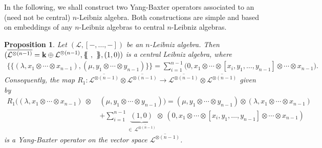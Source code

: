 \documentclass[a4paper,reqno,10pt]{amsart}
\theoremstyle{plain}
\newtheorem{prop}[thm]{Proposition}
\theoremstyle{definition}
\theoremstyle{remark}
\begin{document}
In the following, we shall construct two Yang-Baxter operators associated to an (need not be central) $n$-Leibniz algebra. Both constructions are simple and based on embeddings of any $n$-Leibniz algebras to central $n$-Leibniz algebras.

\begin{prop}
    Let $(\mathcal{L}, [-, \ldots, -])$ be an $n$-Leibniz algebra. Then $( \overline{\mathcal{L}^{\otimes (n-1)}}= {\bf k} \oplus \mathcal{L}^{\otimes (n-1)}, \{ \! \! \{ ~, ~ \} \! \! \}, (1, 0) )$ is a central Leibniz algebra, where
    \begin{align*}
       \{ \! \! \{  (\lambda, x_1 \otimes \cdots \otimes x_{n-1}), (\mu, y_1 \otimes \cdots \otimes y_{n-1}) \} \! \! \} = \sum_{i=1}^{n-1} \big( 0,  x_1 \otimes \cdots \otimes [x_i, y_1, \ldots, y_{n-1}] \otimes \cdots \otimes x_{n-1} \big).
    \end{align*}
    Consequently, the map $R_1 :  \overline{\mathcal{L}^{\otimes (n-1)}} \otimes  \overline{\mathcal{L}^{\otimes (n-1)}} \rightarrow  \overline{\mathcal{L}^{\otimes (n-1)}} \otimes  \overline{\mathcal{L}^{\otimes (n-1)}}$ given by
    \begin{align*}
        R_1 \big(  (\lambda, x_1 \otimes \cdots \otimes x_{n-1}) ~\otimes ~ &  (\mu, y_1 \otimes \cdots \otimes y_{n-1})   \big) = (\mu, y_1 \otimes \cdots \otimes y_{n-1}) \otimes (\lambda, x_1 \otimes \cdots \otimes x_{n-1}) \\
       & + \sum_{i=1}^{n-1} \underbrace{(1, 0)}_{\in ~  \overline{\mathcal{L}^{\otimes (n-1)}}  } \otimes~ (0, x_1 \otimes \cdots \otimes [x_i, y_1, \ldots, y_{n-1}] \otimes \cdots \otimes x_{n-1})
    \end{align*}
    is a Yang-Baxter operator on the vector space $ \overline{\mathcal{L}^{\otimes (n-1)}}$.
\end{prop}
\end{document}
